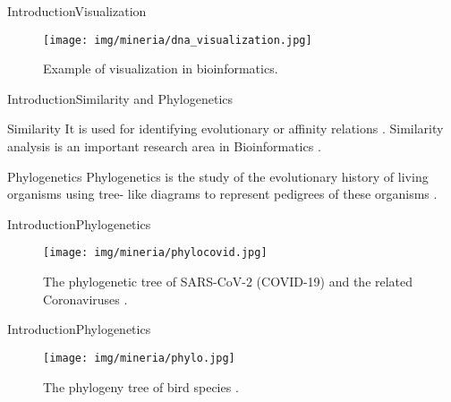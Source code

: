 \documentclass[10pt]{beamer}
\newcommand{\1}{
	\setbeamertemplate{background}{
		\texttt{[image: img/1\_dna]}
		\tikz[overlay] \fill[fill opacity=0.75,fill=white] (0,0) rectangle (-\paperwidth,\paperheight);
	}
}
\begin{document}
\begin{frame}{Introduction}{Visualization}
	\begin{figure}[]
		\centering
		\texttt{[image: img/mineria/dna\_visualization.jpg]}
		\label{img:mot2}
		\caption{Example of visualization in bioinformatics.}
	\end{figure}
\end{frame}


\begin{frame}{Introduction}{Similarity and Phylogenetics}
	\begin{block}{Similarity}
		It is used for identifying evolutionary or affinity relations \cite{delibacs2020dna}. Similarity analysis is an important research area in Bioinformatics \cite{jin2017similarity}.
	\end{block}
	
	\begin{block}{Phylogenetics}
		Phylogenetics is the study of the evolutionary history of living organisms using tree-
		like diagrams to represent pedigrees of these organisms \cite{xiong2006essential}.
	\end{block}
\end{frame}

\begin{frame}{Introduction}{Phylogenetics}
	\begin{figure}[]
		\centering
		\texttt{[image: img/mineria/phylocovid.jpg]}
		\label{img:mot2}
		\caption{The phylogenetic tree of SARS-CoV-2 (COVID-19) and the related Coronaviruses  \cite{tang2020origin}.}
	\end{figure}
\end{frame}

\begin{frame}{Introduction}{Phylogenetics}
	\begin{figure}[]
		\centering
		\texttt{[image: img/mineria/phylo.jpg]}
		\label{img:mot2}
		\caption{The phylogeny tree of bird species  \cite{phylobirds2020}.}
	\end{figure}
\end{frame}
\end{document}
